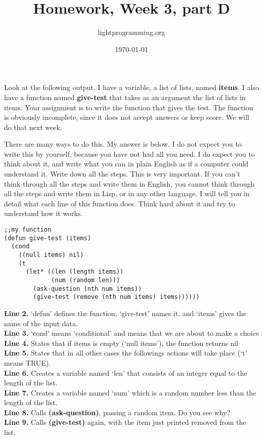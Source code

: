 \documentclass{article}
\title{Homework, Week 3, part D}
\author{lightprogramming.org}
\date{\today}
\begin{document}
\maketitle{}

Look at the following output. I have a variable, a list of lists, named \textbf{items}. I also have a function named \textbf{give-test} that takes as an argument the list of lists in items. Your assignment is to write the function that gives the test. The function is obviously incomplete, since it does not accept answers or keep score. We will do that next week.

There are many ways to do this. My answer is below. I do not expect you to write this by yourself, because you have not had all you need. I do expect you to think about it, and write what you can in plain English as if a computer could understand it. Write down all the steps. This is very important. If you can't think through all the steps and write them in English, you cannot think through all the steps and write them in Lisp, or in any other language. I will tell you in detail what each line of this function does. Think hard about it and try to understand how it works.

\lstset{language=Lisp,numbers=left,keepspaces=false,basicstyle=\small,numberstyle=\tiny,breaklines=true,showstringspaces=false}
\begin{lstlisting}[caption = My function]
;;my function
(defun give-test (items)
  (cond
    ((null items) nil)
    (t
      (let* ((len (length items))
             (num (random len)))
        (ask-question (nth num items))
        (give-test (remove (nth num items) items))))))
\end{lstlisting}

\textbf{Line 2.} `defun' defines the function, `give-test' names it, and `items' gives the name of the input data.\\
\textbf{Line 3.} `cond' means `conditional' and means that we are about to make a choice\\
\textbf{Line 4.} States that if items is empty (`null items'), the function returns nil\\
\textbf{Line 5.} States that in all other cases the followings actions will take place (`t' means TRUE).\\
\textbf{Line 6.} Creates a variable named `len' that consists of an integer equal to the length of the list.\\
\textbf{Line 7.} Creates a variable named `num' which is a random number less than the length of the list.\\
\textbf{Line 8.} Calls \textbf{(ask-question)}, passing a random item. Do you see why?\\
\textbf{Line 9.} Calls \textbf{(give-test)} again, with the item just printed removed from the list.\\
\end{document}
